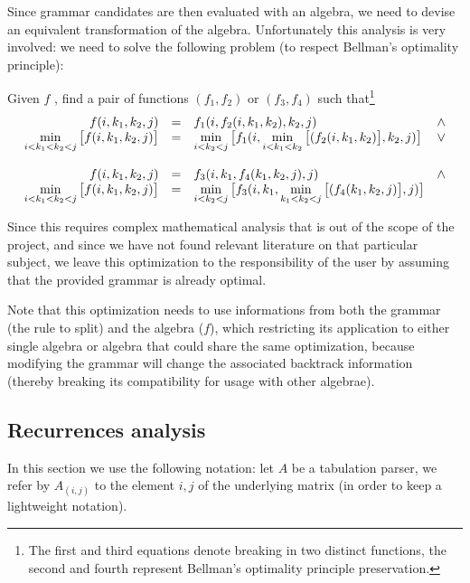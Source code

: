 Since grammar candidates are then evaluated with an algebra, we need to devise an equivalent transformation of the algebra. Unfortunately this analysis is very involved: we need to solve the following problem (to respect Bellman's optimality principle\cite{bellman_principle}):

Given $f$ , find a pair of functions $(f_1,f_2)$ or $(f_3,f_4)$ such that\footnote{The first and third equations denote breaking in two distinct functions, the second and fourth represent Bellman's optimality principle preservation.}
\[\begin{array}{rcll}
f(i,k_1,k_2,j) &=& f_1(i,f_2(i,k_1,k_2),k_2,j) & \land \\
	\min\limits_{i<k_1<k_2<j}\big[ f(i,k_1,k_2,j) \big] &=& \min\limits_{i<k_2<j} \big[ f_1(i,\min\limits_{i<k_1<k_2} \big[ (f_2(i,k_1,k_2  ) \big],k_2,j) \big] & \lor \vspace{12pt} \\
f(i,k_1,k_2,j) &=& f_3(i,k_1,f_4(k_1,k_2,j),j) & \land \\
	\min\limits_{i<k_1<k_2<j}\big[ f(i,k_1,k_2,j) \big] &=& \min\limits_{i<k_2<j} \big[ f_3(i,k_1,\min\limits_{k_1<k_2<j} \big[ (f_4(k_1,k_2,j) \big],j) \big]
\end{array}\]

Since this requires complex mathematical analysis that is out of the scope of the project, and since we have not found relevant literature on that particular subject, we leave this optimization to the responsibility of the user by assuming that the provided grammar is already optimal.

Note that this optimization needs to use informations from both the grammar (the rule to split) and the algebra ($f$), which restricting its application to either single algebra or algebra that could share the same optimization, because modifying the grammar will change the associated backtrack information (thereby breaking its compatibility for usage with other algebrae).

\subsection{Recurrences analysis} \label{recurrences}
In this section we use the following notation: let $A$ be a tabulation parser, we refer by $A_{(i,j)}$ to the element $i,j$ of the underlying matrix (in order to keep a lightweight notation).
